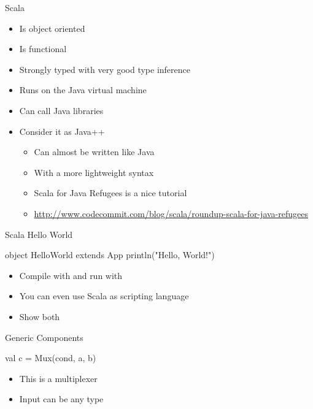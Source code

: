 \begin{frame}[fragile]{Scala}
\begin{itemize}
\item Is object oriented
\item Is functional
\item Strongly typed with very good type inference
\item Runs on the Java virtual machine
\item Can call Java libraries
\item Consider it as Java++
\begin{itemize}
\item Can almost be written like Java
\item With a more lightweight syntax
\item Scala for Java Refugees is a nice tutorial
\item \url{http://www.codecommit.com/blog/scala/roundup-scala-for-java-refugees}
\end{itemize}
\end{itemize}
\end{frame}

\begin{frame}[fragile]{Scala Hello World}
\begin{chisel}
object HelloWorld extends App {
  println("Hello, World!")
}
\end{chisel}
\begin{itemize}
\item Compile with  and run with 
\item You can even use Scala as scripting language
\item Show both
\end{itemize}
\end{frame}



\begin{frame}[fragile]{Generic Components}
\begin{chisel}
val c = Mux(cond, a, b)
\end{chisel}
\begin{itemize}
\item This is a multiplexer
\item Input can be any type
\end{itemize}
\end{frame}

